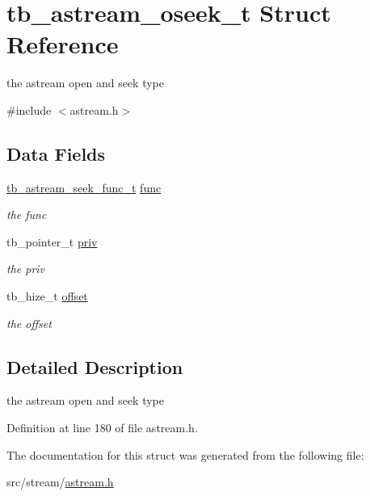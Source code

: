 \hypertarget{structtb__astream__oseek__t}{\section{tb\-\_\-astream\-\_\-oseek\-\_\-t Struct Reference}
\label{structtb__astream__oseek__t}
}


the astream open and seek type  




{\ttfamily \#include $<$astream.\-h$>$}

\subsection*{Data Fields}
\begin{DoxyCompactItemize}
\item 
\hypertarget{structtb__astream__oseek__t_a3bf5e6c7a14d270f9526c248e75d9d3c}{\hyperlink{astream_8h_a2c68bce4ed336abc6759878c0d083c5d}{tb\-\_\-astream\-\_\-seek\-\_\-func\-\_\-t} \hyperlink{structtb__astream__oseek__t_a3bf5e6c7a14d270f9526c248e75d9d3c}{func}}\label{structtb__astream__oseek__t_a3bf5e6c7a14d270f9526c248e75d9d3c}

\begin{DoxyCompactList}\small\item\em the func \end{DoxyCompactList}\item 
\hypertarget{structtb__astream__oseek__t_a064e8885771a5d97c24d4fbfb38b6131}{tb\-\_\-pointer\-\_\-t \hyperlink{structtb__astream__oseek__t_a064e8885771a5d97c24d4fbfb38b6131}{priv}}\label{structtb__astream__oseek__t_a064e8885771a5d97c24d4fbfb38b6131}

\begin{DoxyCompactList}\small\item\em the priv \end{DoxyCompactList}\item 
\hypertarget{structtb__astream__oseek__t_a65b9f27cf62c99be903cebdc5c633bfe}{tb\-\_\-hize\-\_\-t \hyperlink{structtb__astream__oseek__t_a65b9f27cf62c99be903cebdc5c633bfe}{offset}}\label{structtb__astream__oseek__t_a65b9f27cf62c99be903cebdc5c633bfe}

\begin{DoxyCompactList}\small\item\em the offset \end{DoxyCompactList}\end{DoxyCompactItemize}


\subsection{Detailed Description}
the astream open and seek type 

Definition at line 180 of file astream.\-h.



The documentation for this struct was generated from the following file\-:\begin{DoxyCompactItemize}
\item 
src/stream/\hyperlink{astream_8h}{astream.\-h}\end{DoxyCompactItemize}
